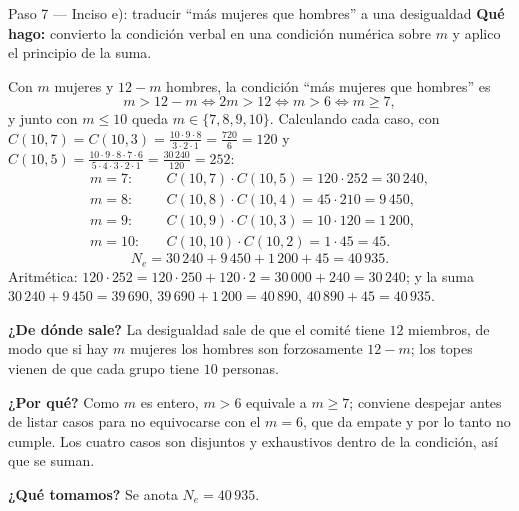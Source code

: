 \documentclass[11pt]{article}
\begin{document}
\begin{paso}{Paso 7 --- Inciso e): traducir ``más mujeres que hombres'' a una desigualdad}
\textbf{Qué hago:} convierto la condición verbal en una condición numérica sobre $m$ y aplico el principio de la suma.

Con $m$ mujeres y $12-m$ hombres, la condición ``más mujeres que hombres'' es
\[
  m > 12-m \iff 2m > 12 \iff m > 6 \iff m\ge 7 ,
\]
y junto con $m\le 10$ queda $m\in\{7,8,9,10\}$. Calculando cada caso, con $C(10,7)=C(10,3)=\frac{10\cdot 9\cdot 8}{3\cdot 2\cdot 1}=\frac{720}{6}=120$ y $C(10,5)=\frac{10\cdot 9\cdot 8\cdot 7\cdot 6}{5\cdot 4\cdot 3\cdot 2\cdot 1}=\frac{30\,240}{120}=252$:
\begin{align*}
  m=7:&\quad C(10,7)\cdot C(10,5)=120\cdot 252 = 30\,240,\\
  m=8:&\quad C(10,8)\cdot C(10,4)=45\cdot 210 = 9\,450,\\
  m=9:&\quad C(10,9)\cdot C(10,3)=10\cdot 120 = 1\,200,\\
  m=10:&\quad C(10,10)\cdot C(10,2)=1\cdot 45 = 45 .
\end{align*}
\[
  N_e = 30\,240+9\,450+1\,200+45 = 40\,935 .
\]
Aritmética: $120\cdot 252 = 120\cdot 250 + 120\cdot 2 = 30\,000+240=30\,240$; y la suma $30\,240+9\,450=39\,690$, $39\,690+1\,200=40\,890$, $40\,890+45=40\,935$.

\textbf{¿De dónde sale?} La desigualdad sale de que el comité tiene $12$ miembros, de modo que si hay $m$ mujeres los hombres son forzosamente $12-m$; los topes vienen de que cada grupo tiene $10$ personas.

\textbf{¿Por qué?} Como $m$ es entero, $m>6$ equivale a $m\ge 7$; conviene despejar antes de listar casos para no equivocarse con el $m=6$, que da empate y por lo tanto no cumple. Los cuatro casos son disjuntos y exhaustivos dentro de la condición, así que se suman.

\textbf{¿Qué tomamos?} Se anota $N_e=40\,935$.
\end{paso}
\end{document}
